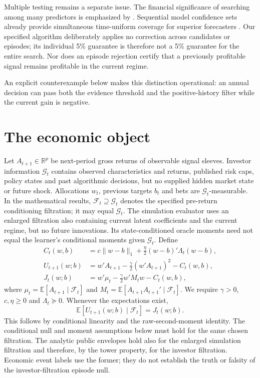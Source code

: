 \documentclass[11pt,a4paper]{article}
\theoremstyle{remark}\newtheorem{remark}[theorem]{Remark}
\newcommand{\E}{\mathbb E}\newcommand{\Prb}{\mathbb P}
\newcommand{\F}{\mathcal F}\newcommand{\G}{\mathcal G}\newcommand{\W}{\mathcal W}
\newcommand{\norm}[1]{\lVert#1\rVert}\newcommand{\pos}[1]{[#1]_+}
\begin{document}
Multiple testing remains a separate issue. The financial significance of
searching among many predictors is emphasized by \cite{hlz}. Sequential model
confidence sets already provide simultaneous time-uniform coverage for
superior forecasters \cite{smcs}. Our specified
algorithm deliberately applies no correction across candidates or episodes;
its individual 5\% guarantee is therefore not a 5\% guarantee for the entire
search. Nor does an episode rejection certify that a previously profitable
signal remains profitable in the current regime.

An explicit counterexample below makes this distinction operational: an
annual decision can pass both the evidence threshold and the positive-history
filter while the current gain is negative.

\section{The economic object}
Let $A_{t+1}\in\mathbb R^p$ be next-period gross returns of observable signal
sleeves. Investor information $\G_t$ contains observed characteristics and
returns, published risk caps, policy states and past algorithmic decisions,
but no supplied hidden market state or future shock. Allocations $w_t$,
previous targets $b_t$ and bets are $\G_t$-measurable. In the mathematical
results, $\F_t\supseteq\G_t$ denotes the specified pre-return conditioning
filtration; it may equal $\G_t$. The simulation evaluator uses an enlarged
filtration also containing current latent coefficients and the current regime,
but no future innovations. Its state-conditioned oracle moments need not equal
the learner's conditional moments given $\G_t$. Define
\begin{align}
 C_t(w,b)&=c\norm{w-b}_1+\frac\eta2(w-b)'\Lambda_t(w-b),\\
 U_{t+1}(w;b)&=w'A_{t+1}-\frac\gamma2(w'A_{t+1})^2-C_t(w,b),\label{eq:utility}\\
 J_t(w;b)&=w'\mu_t-\frac\gamma2w'M_tw-C_t(w,b),\label{eq:objective}
\end{align}
where $\mu_t=\E[A_{t+1}\mid\F_t]$ and
$M_t=\E[A_{t+1}A_{t+1}'\mid\F_t]$. We require $\gamma>0$, $c,\eta\ge0$
and $\Lambda_t\succeq0$. Whenever the expectations exist,
\begin{equation}
 \E[U_{t+1}(w;b)\mid\F_t]=J_t(w;b).
\end{equation}
This follows by conditional linearity and the raw-second-moment identity.
The conditional null and moment assumptions below must hold for the same
chosen filtration. The analytic public envelopes hold also for the enlarged
simulation filtration and therefore, by the tower property, for the investor
filtration. Economic event labels use the former; they do not establish the
truth or falsity of the investor-filtration episode null.
\end{document}
